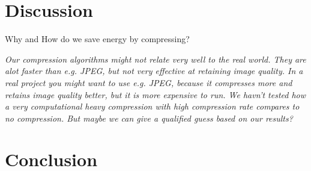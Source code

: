\section{Discussion}
Why and How do we save energy by compressing?



\textit{
Our compression algorithms might not relate very well to the real world.
They are alot faster than e.g. JPEG, but not very effective at retaining image quality.
In a real project you might want to use e.g. JPEG, because it compresses more and retains image quality better, but it is more expensive to run.
We havn't tested how a very computational heavy compression with high compression rate compares to no compression.
But maybe we can give a qualified guess based on our results?}

\section{Conclusion}